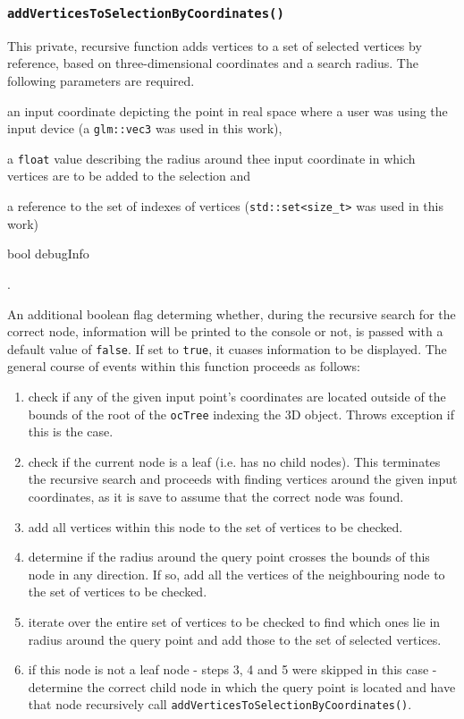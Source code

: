 	\subsubsection{\texttt{addVerticesToSelectionByCoordinates()}}
	\label{sec:addVerticesToSelectionByCoordinates()}
This private, recursive function adds vertices to a set of selected vertices by reference, based on three-dimensional coordinates and a search radius. The following parameters are required.
\begin{enumerate*}
	\item an input coordinate depicting the point in real space where a user was using the input device (a \texttt{glm::vec3} was used in this work),
	\item a \texttt{float} value describing the radius around thee input coordinate in which vertices are to be added to the selection and
	\item a reference to the set of indexes of vertices (\texttt{std::set<size\_t>} was used in this work)
	\item bool debugInfo
\end{enumerate*}.

An additional boolean flag determing whether, during the recursive search for the correct node, information will be printed to the console or not, is passed with a default value of \texttt{false}. If set to \texttt{true}, it cuases information to be displayed. The general course of events within this function proceeds as follows:
\begin{enumerate}
	\item check if any of the given input point's coordinates are located outside of the bounds of the root of the \texttt{ocTree} indexing the 3D object. Throws exception if this is the case.
	\item check if the current node is a leaf (i.e. has no child nodes). This terminates the recursive search and proceeds with finding vertices around the given input coordinates, as it is save to assume that the correct node was found.
	\item add all vertices within this node to the set of vertices to be checked.
	\item determine if the radius around the query point crosses the bounds of this node in any direction. If so, add all the vertices of the neighbouring node to the set of vertices to be checked.
	\item iterate over the entire set of vertices to be checked to find which ones lie in radius around the query point and add those to the set of selected vertices.
	\item if this node is not a leaf node - steps 3, 4 and 5 were skipped in this case - determine the correct child node in which the query point is located and have that node recursively call \texttt{addVerticesToSelectionByCoordinates()}.
\end{enumerate}

